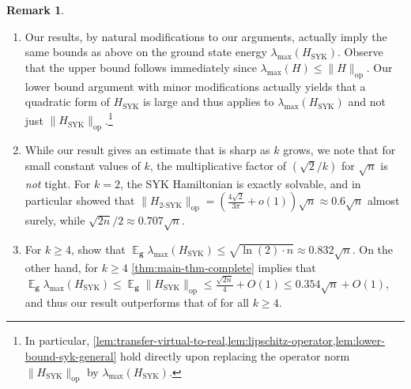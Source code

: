 \documentclass
[11pt,letterpaper]
{article}
\theoremstyle{definition}
\newtheorem{remark}[theorem]{Remark}
\newcommand{\op}{\operatorname{op}}
\newcommand{\1}{\mathbf{1}}
\DeclareMathOperator*{\E}{\mathbb{E}}
\renewcommand{\geq}{\geqslant}
\renewcommand{\leq}{\leqslant}
\newcommand{\syk}{\operatorname{SYK}}
\begin{document}
\begin{remark}
    \begin{enumerate}[(1)]
    \item Our results, by natural modifications to our arguments, actually imply the same bounds as above on the ground state energy $\lambda_{\max}(H_{\syk})$. Observe that the upper bound follows immediately since $\lambda_{\max}(H)\leq \|H\|_{\op}.$ Our lower bound argument with minor modifications actually yields that a quadratic form of $H_{\syk}$ is large and thus applies to $\lambda_{\max}(H_{\syk})$ and not just $\|H_{\syk}\|_{\op}$.\footnote{In particular, \cref{lem:transfer-virtual-to-real,lem:lipschitz-operator,lem:lower-bound-syk-general} hold directly upon replacing the operator norm $\|H_{\syk}\|_{\op}$ by $\lambda_{\max}(H_{\syk})$.} 
    \item While our result gives an estimate that is sharp as $k$ grows, we note that for small constant values of $k$, the multiplicative factor of $(\sqrt{2}/k)$ for $\sqrt{n}$ is \emph{not} tight. For $k = 2$, the SYK Hamiltonian is exactly solvable, and in particular \cite{MaldacenaS16,feng2019spectrum} showed that $\|H_{\operatorname{2-SYK}}\|_{\operatorname{op}} = (\frac{4\sqrt{2}}{3\pi} + o(1))\sqrt{n}\approx 0.6\sqrt{n}$ almost surely, while $\sqrt{2n}/2\approx 0.707\sqrt{n}$.
    \item For $k\geq 4$, \cite{feng2019spectrum} show that $\E_{\bm g}\lambda_{\max}(H_{\operatorname{SYK}})\leq\sqrt{\ln(2)\cdot n}\approx 0.832\sqrt{n}$. On the other hand, for $k\geq 4$ \cref{thm:main-thm-complete} implies that $\E_{\bm g}\lambda_{\max}(H_{\operatorname{SYK}})\leq\E_{\bm g}\|H_{\operatorname{SYK}}\|_{\operatorname{op}}\leq\frac{\sqrt{2n}}{4} + O(1)\leq 0.354\sqrt{n} + O(1)$, and thus our result outperforms that of \cite{feng2019spectrum} for all $k\geq 4$.

\end{enumerate}
\end{remark}
\end{document}
